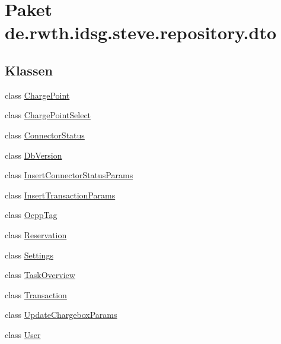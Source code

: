 \hypertarget{namespacede_1_1rwth_1_1idsg_1_1steve_1_1repository_1_1dto}{\section{Paket de.\-rwth.\-idsg.\-steve.\-repository.\-dto}
\label{namespacede_1_1rwth_1_1idsg_1_1steve_1_1repository_1_1dto}
}
\subsection*{Klassen}
\begin{DoxyCompactItemize}
\item 
class \hyperlink{classde_1_1rwth_1_1idsg_1_1steve_1_1repository_1_1dto_1_1_charge_point}{Charge\-Point}
\item 
class \hyperlink{classde_1_1rwth_1_1idsg_1_1steve_1_1repository_1_1dto_1_1_charge_point_select}{Charge\-Point\-Select}
\item 
class \hyperlink{classde_1_1rwth_1_1idsg_1_1steve_1_1repository_1_1dto_1_1_connector_status}{Connector\-Status}
\item 
class \hyperlink{classde_1_1rwth_1_1idsg_1_1steve_1_1repository_1_1dto_1_1_db_version}{Db\-Version}
\item 
class \hyperlink{classde_1_1rwth_1_1idsg_1_1steve_1_1repository_1_1dto_1_1_insert_connector_status_params}{Insert\-Connector\-Status\-Params}
\item 
class \hyperlink{classde_1_1rwth_1_1idsg_1_1steve_1_1repository_1_1dto_1_1_insert_transaction_params}{Insert\-Transaction\-Params}
\item 
class \hyperlink{classde_1_1rwth_1_1idsg_1_1steve_1_1repository_1_1dto_1_1_ocpp_tag}{Ocpp\-Tag}
\item 
class \hyperlink{classde_1_1rwth_1_1idsg_1_1steve_1_1repository_1_1dto_1_1_reservation}{Reservation}
\item 
class \hyperlink{classde_1_1rwth_1_1idsg_1_1steve_1_1repository_1_1dto_1_1_settings}{Settings}
\item 
class \hyperlink{classde_1_1rwth_1_1idsg_1_1steve_1_1repository_1_1dto_1_1_task_overview}{Task\-Overview}
\item 
class \hyperlink{classde_1_1rwth_1_1idsg_1_1steve_1_1repository_1_1dto_1_1_transaction}{Transaction}
\item 
class \hyperlink{classde_1_1rwth_1_1idsg_1_1steve_1_1repository_1_1dto_1_1_update_chargebox_params}{Update\-Chargebox\-Params}
\item 
class \hyperlink{classde_1_1rwth_1_1idsg_1_1steve_1_1repository_1_1dto_1_1_user}{User}
\end{DoxyCompactItemize}
